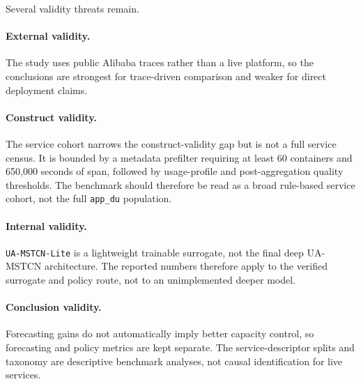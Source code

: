 Several validity threats remain.

\paragraph{External validity.}
The study uses public Alibaba traces rather than a live platform, so the conclusions are strongest for trace-driven comparison and weaker for direct deployment claims.

\paragraph{Construct validity.}
The service cohort narrows the construct-validity gap but is not a full service census. It is bounded by a metadata prefilter requiring at least 60 containers and 650{,}000 seconds of span, followed by usage-profile and post-aggregation quality thresholds. The benchmark should therefore be read as a broad rule-based service cohort, not the full \texttt{app\_du} population.

\paragraph{Internal validity.}
\texttt{UA-MSTCN-Lite} is a lightweight trainable surrogate, not the final deep UA-MSTCN architecture. The reported numbers therefore apply to the verified surrogate and policy route, not to an unimplemented deeper model.

\paragraph{Conclusion validity.}
Forecasting gains do not automatically imply better capacity control, so forecasting and policy metrics are kept separate. The service-descriptor splits and taxonomy are descriptive benchmark analyses, not causal identification for live services.
